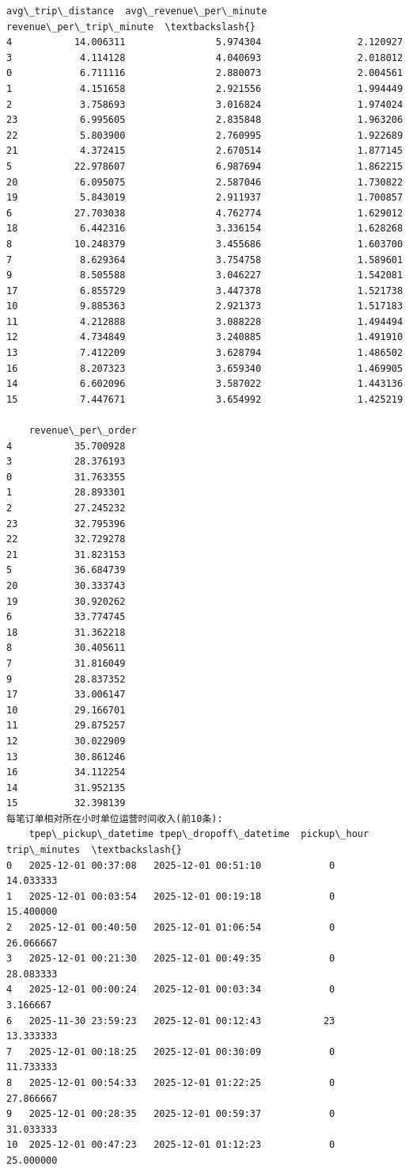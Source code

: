 \documentclass[11pt]{article}
\begin{document}
\begin{Verbatim}[commandchars=\\\{\}]
    avg\_trip\_distance  avg\_revenue\_per\_minute  revenue\_per\_trip\_minute  \textbackslash{}
4           14.006311                5.974304                 2.120927
3            4.114128                4.040693                 2.018012
0            6.711116                2.880073                 2.004561
1            4.151658                2.921556                 1.994449
2            3.758693                3.016824                 1.974024
23           6.995605                2.835848                 1.963206
22           5.803900                2.760995                 1.922689
21           4.372415                2.670514                 1.877145
5           22.978607                6.987694                 1.862215
20           6.095075                2.587046                 1.730822
19           5.843019                2.911937                 1.700857
6           27.703038                4.762774                 1.629012
18           6.442316                3.336154                 1.628268
8           10.248379                3.455686                 1.603700
7            8.629364                3.754758                 1.589601
9            8.505588                3.046227                 1.542081
17           6.855729                3.447378                 1.521738
10           9.885363                2.921373                 1.517183
11           4.212888                3.088228                 1.494494
12           4.734849                3.240885                 1.491910
13           7.412209                3.628794                 1.486502
16           8.207323                3.659340                 1.469905
14           6.602096                3.587022                 1.443136
15           7.447671                3.654992                 1.425219

    revenue\_per\_order
4           35.700928
3           28.376193
0           31.763355
1           28.893301
2           27.245232
23          32.795396
22          32.729278
21          31.823153
5           36.684739
20          30.333743
19          30.920262
6           33.774745
18          31.362218
8           30.405611
7           31.816049
9           28.837352
17          33.006147
10          29.166701
11          29.875257
12          30.022909
13          30.861246
16          34.112254
14          31.952135
15          32.398139
每笔订单相对所在小时单位运营时间收入(前10条):
    tpep\_pickup\_datetime tpep\_dropoff\_datetime  pickup\_hour  trip\_minutes  \textbackslash{}
0   2025-12-01 00:37:08   2025-12-01 00:51:10            0     14.033333
1   2025-12-01 00:03:54   2025-12-01 00:19:18            0     15.400000
2   2025-12-01 00:40:50   2025-12-01 01:06:54            0     26.066667
3   2025-12-01 00:21:30   2025-12-01 00:49:35            0     28.083333
4   2025-12-01 00:00:24   2025-12-01 00:03:34            0      3.166667
6   2025-11-30 23:59:23   2025-12-01 00:12:43           23     13.333333
7   2025-12-01 00:18:25   2025-12-01 00:30:09            0     11.733333
8   2025-12-01 00:54:33   2025-12-01 01:22:25            0     27.866667
9   2025-12-01 00:28:35   2025-12-01 00:59:37            0     31.033333
10  2025-12-01 00:47:23   2025-12-01 01:12:23            0     25.000000


\end{Verbatim}
\end{document}
